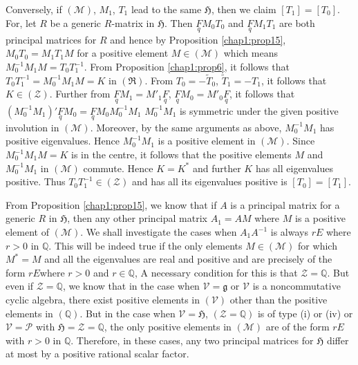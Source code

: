 Conversely, if $(\mathscr{M})$, $M_{1}$, $T_{1}$ lead to the same
$\mathfrak{H}$, then we claim $[T_{1}]=[T_{0}]$. For, let $R$ be a
generic $R$-matrix in $\mathfrak{H}$. Then $\underset{q}{F}M_{0}T_{0}$
and $\underset{q}{F}M_{1}T_{1}$ are both principal matrices for $R$
and hence by Proposition \ref{chap1:prop15}, $M_{0}T_{0}=M_{1}T_{1}M$ for a
positive element $M\in(\mathscr{M})$ which means
$M^{-1}_{0}M_{1}M=T_{0}T^{-1}_{1}$. From Proposition \ref{chap1:prop6}, it
follows that $T_{0}T^{-1}_{1}=M^{-1}_{0}M_{1}M=K$ in
$(\mathfrak{R})$. From $T_{0}=-\widetilde{T}_{0}$,
$\widetilde{T}_{1}=-T_{1}$, it follows that
$K\in(\mathscr{Z})$. Further from
$\underset{q}{F}M_{1}=M'_{1}\underset{q}{F}$,
$\underset{q}{F}M_{0}=M'_{0}\underset{q}{F}$, it follows that
$(M^{-1}_{0}M_{1})'\underset{q}{F}M_{0}=\underset{q}{F}M_{0}M^{-1}_{0}M_{1}$
\ie $M^{-1}_{0}M_{1}$ is symmetric under the given positive involution
in $(\mathscr{M})$. Moreover, by the same arguments as above,
$M^{-1}_{0}M_{1}$ has positive eigenvalues. Hence $M^{-1}_{0}M_{1}$ is
a positive element in $(\mathscr{M})$. Since $M^{-1}_{0}M_{1}M=K$ is
in the centre, it follows that the positive elements $M$ and
$M^{-1}_{0}M_{1}$ in $(\mathscr{M})$ commute. Hence $K=K^{\ast}$ and
further $K$ has all eigenvalues positive. Thus $T_{0}T^{-1}_{1}\in
(\mathscr{Z})$ and has all its eigenvalues positive is
$[T_{0}]=[T_{1}]$.

From Proposition \ref{chap1:prop15}, we know that if $A$ is a principal
matrix for a generic $R$ in $\mathfrak{H}$, then any other principal
matrix $A_{1}=AM$ where $M$ is a positive element of
$(\mathscr{M})$. We shall investigate the cases when $A_{1}A^{-1}$ is
always $rE$ where $r>0$ in $\mathbb{Q}$. This will be indeed true if
the only elements $M\in(\mathscr{M})$ for which $M^{\ast}=M$ and all
the eigenvalues are real and positive and are precisely of the form 
$rE$\pageoriginale where $r>0$ and $r\in\mathbb{Q}$, A necessary
condition for this is that $\mathscr{Z}=\mathbb{Q}$. But even if
$\mathscr{Z}=\mathbb{Q}$, we know that in the case when
$\mathscr{V}=\mathfrak{g}$ or $\mathscr{V}$ is a noncommutative cyclic
algebra, there exist positive elements in $(\mathscr{V})$ other than
the positive elements in $(\mathbb{Q})$. But in the case when
$\mathscr{V}=\mathfrak{H}$, $(\mathscr{Z}=\mathbb{Q})$ is of type (i)
or (iv) or $\mathscr{V}=\mathscr{P}$ with
$\mathfrak{H}=\mathscr{Z}=\mathbb{Q}$, the only positive elements in
$(\mathscr{M})$ are of the form $rE$ with $r>0$ in
$\mathbb{Q}$. Therefore, in these cases, any two principal matrices
for $\mathfrak{H}$ differ at most by a positive rational scalar
factor.

